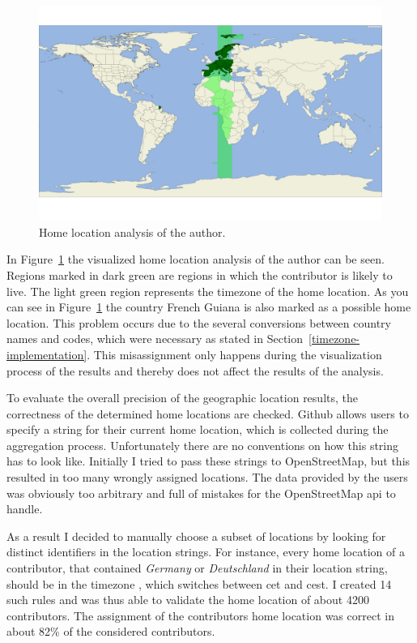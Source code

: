 \begin{figure}[H]
    \includegraphics[scale=0.10]{./graphs/analysis/author-home-location}
    \centering
    \caption{Home location analysis of the author.}\label{fig:author-home-location}
\end{figure}

In Figure~\ref{fig:author-home-location} the visualized home location analysis of the author can be seen.
Regions marked in dark green are regions in which the contributor is likely to live.
The light green region represents the timezone of the home location.
As you can see in Figure~\ref{fig:author-home-location} the country French Guiana is also marked as a possible home location.
This problem occurs due to the several conversions between country names and codes, which were necessary as stated in Section~\ref{timezone-implementation}.
This misassignment only happens during the visualization process of the results and thereby does not affect the results of the analysis.

To evaluate the overall precision of the geographic location results, the correctness of the determined home locations are checked.
Github allows users to specify a string for their current home location, which is collected during the aggregation process.
Unfortunately there are no conventions on how this string has to look like.
Initially I tried to pass these strings to OpenStreetMap, but this resulted in too many wrongly assigned locations.
The data provided by the users was obviously too arbitrary and full of mistakes for the OpenStreetMap \ac{api} to handle.

As a result I decided to manually choose a subset of locations by looking for distinct identifiers in the location strings.
For instance, every home location of a contributor, that contained \emph{Germany} or \emph{Deutschland} in their location string, should be in the timezone , which switches between \ac{cet} and \ac{cest}.
I created 14 such rules and was thus able to validate the home location of about 4200 contributors.
The assignment of the contributors home location was correct in about 82\% of the considered contributors.


